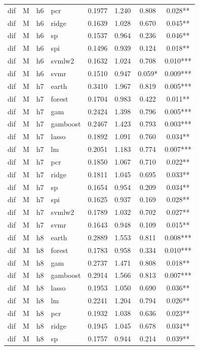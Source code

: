 \begin{ThreePartTable}
\begin{longtable}[t]{llclcccc}
dif & M & h6 & pcr & 0.1977 & 1.240 & 0.808 & 0.028**\\
dif & M & h6 & ridge & 0.1639 & 1.028 & 0.670 & 0.045**\\
dif & M & h6 & sp & 0.1537 & 0.964 & 0.236 & 0.046**\\
dif & M & h6 & spi & 0.1496 & 0.939 & 0.124 & 0.018**\\
dif & M & h6 & svmlw2 & 0.1632 & 1.024 & 0.708 & 0.010***\\
dif & M & h6 & svmr & 0.1510 & 0.947 & 0.059* & 0.009***\\
\addlinespace
dif & M & h7 & earth & 0.3410 & 1.967 & 0.819 & 0.005***\\
dif & M & h7 & forest & 0.1704 & 0.983 & 0.422 & 0.011**\\
dif & M & h7 & gam & 0.2424 & 1.398 & 0.796 & 0.005***\\
dif & M & h7 & gamboost & 0.2467 & 1.423 & 0.793 & 0.003***\\
dif & M & h7 & lasso & 0.1892 & 1.091 & 0.760 & 0.034**\\
dif & M & h7 & lm & 0.2051 & 1.183 & 0.774 & 0.007***\\
dif & M & h7 & pcr & 0.1850 & 1.067 & 0.710 & 0.022**\\
dif & M & h7 & ridge & 0.1811 & 1.045 & 0.695 & 0.033**\\
dif & M & h7 & sp & 0.1654 & 0.954 & 0.209 & 0.034**\\
dif & M & h7 & spi & 0.1625 & 0.937 & 0.169 & 0.028**\\
dif & M & h7 & svmlw2 & 0.1789 & 1.032 & 0.702 & 0.027**\\
dif & M & h7 & svmr & 0.1643 & 0.948 & 0.109 & 0.015**\\
\addlinespace
dif & M & h8 & earth & 0.2889 & 1.553 & 0.811 & 0.008***\\
dif & M & h8 & forest & 0.1783 & 0.958 & 0.334 & 0.010***\\
dif & M & h8 & gam & 0.2737 & 1.471 & 0.808 & 0.018**\\
dif & M & h8 & gamboost & 0.2914 & 1.566 & 0.813 & 0.007***\\
dif & M & h8 & lasso & 0.1953 & 1.050 & 0.690 & 0.036**\\
dif & M & h8 & lm & 0.2241 & 1.204 & 0.794 & 0.026**\\
dif & M & h8 & pcr & 0.1932 & 1.038 & 0.636 & 0.023**\\
dif & M & h8 & ridge & 0.1945 & 1.045 & 0.678 & 0.034**\\
dif & M & h8 & sp & 0.1757 & 0.944 & 0.214 & 0.039**\\

\end{longtable}
\end{ThreePartTable}
